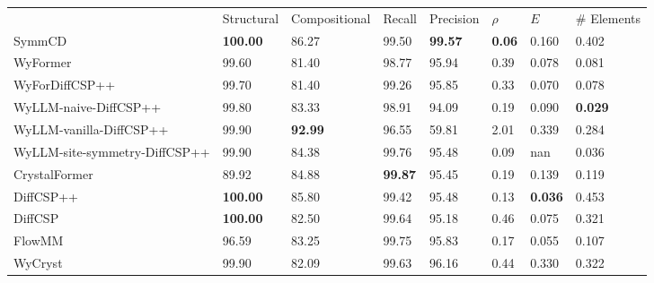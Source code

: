 \begin{tabular}{llllllll}
{} & {Structural} & {Compositional} & {Recall} & {Precision} & {$\rho$} & {$E$} & {# Elements} \\
SymmCD & \bfseries 100.00 & 86.27 & 99.50 & \bfseries 99.57 & \bfseries 0.06 & 0.160 & 0.402 \\
WyFormer & 99.60 & 81.40 & 98.77 & 95.94 & 0.39 & 0.078 & 0.081 \\
WyForDiffCSP++ & 99.70 & 81.40 & 99.26 & 95.85 & 0.33 & 0.070 & 0.078 \\
WyLLM-naive-DiffCSP++ & 99.80 & 83.33 & 98.91 & 94.09 & 0.19 & 0.090 & \bfseries 0.029 \\
WyLLM-vanilla-DiffCSP++ & 99.90 & \bfseries 92.99 & 96.55 & 59.81 & 2.01 & 0.339 & 0.284 \\
WyLLM-site-symmetry-DiffCSP++ & 99.90 & 84.38 & 99.76 & 95.48 & 0.09 & nan & 0.036 \\
CrystalFormer & 89.92 & 84.88 & \bfseries 99.87 & 95.45 & 0.19 & 0.139 & 0.119 \\
DiffCSP++ & \bfseries 100.00 & 85.80 & 99.42 & 95.48 & 0.13 & \bfseries 0.036 & 0.453 \\
DiffCSP & \bfseries 100.00 & 82.50 & 99.64 & 95.18 & 0.46 & 0.075 & 0.321 \\
FlowMM & 96.59 & 83.25 & 99.75 & 95.83 & 0.17 & 0.055 & 0.107 \\
WyCryst & 99.90 & 82.09 & 99.63 & 96.16 & 0.44 & 0.330 & 0.322 \\
\end{tabular}
